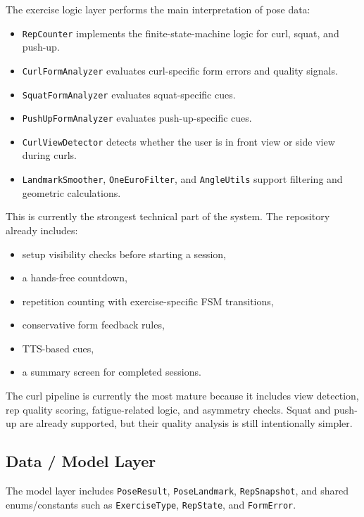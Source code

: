 \documentclass[12pt,a4paper]{article}
\begin{document}
The exercise logic layer performs the main interpretation of pose data:

\begin{itemize}
    \item \texttt{RepCounter} implements the finite-state-machine logic for curl, squat, and push-up.
    \item \texttt{CurlFormAnalyzer} evaluates curl-specific form errors and quality signals.
    \item \texttt{SquatFormAnalyzer} evaluates squat-specific cues.
    \item \texttt{PushUpFormAnalyzer} evaluates push-up-specific cues.
    \item \texttt{CurlViewDetector} detects whether the user is in front view or side view during curls.
    \item \texttt{LandmarkSmoother}, \texttt{OneEuroFilter}, and \texttt{AngleUtils} support filtering and geometric calculations.
\end{itemize}

This is currently the strongest technical part of the system. The repository already includes:

\begin{itemize}
    \item setup visibility checks before starting a session,
    \item a hands-free countdown,
    \item repetition counting with exercise-specific FSM transitions,
    \item conservative form feedback rules,
    \item TTS-based cues,
    \item a summary screen for completed sessions.
\end{itemize}

The curl pipeline is currently the most mature because it includes view detection, rep quality scoring, fatigue-related logic, and asymmetry checks. Squat and push-up are already supported, but their quality analysis is still intentionally simpler.

\subsection{Data / Model Layer}

The model layer includes \texttt{PoseResult}, \texttt{PoseLandmark}, \texttt{RepSnapshot}, and shared enums/constants such as \texttt{ExerciseType}, \texttt{RepState}, and \texttt{FormError}.
\end{document}
